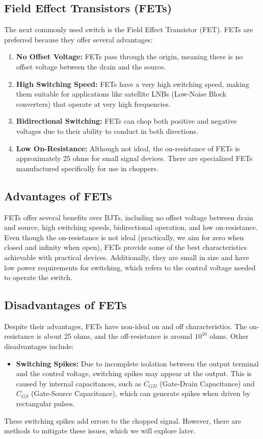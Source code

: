 \documentclass[a4paper,9pt,twoside,openany,twocolumn]{memoir}
\begin{document}
\subsection{Field Effect Transistors (FETs)}
The next commonly used switch is the Field Effect Transistor (FET). FETs are preferred because they offer several advantages:
\begin{enumerate}
    \item \textbf{No Offset Voltage:} FETs pass through the origin, meaning there is no offset voltage between the drain and the source.
    \item \textbf{High Switching Speed:} FETs have a very high switching speed, making them suitable for applications like satellite LNBs (Low-Noise Block converters) that operate at very high frequencies.
    \item \textbf{Bidirectional Switching:} FETs can chop both positive and negative voltages due to their ability to conduct in both directions.
    \item \textbf{Low On-Resistance:} Although not ideal, the on-resistance of FETs is approximately 25 ohms for small signal devices. There are specialized FETs manufactured specifically for use in choppers.
\end{enumerate}

\subsection{Advantages of FETs}
FETs offer several benefits over BJTs, including no offset voltage between drain and source, high switching speeds, bidirectional operation, and low on-resistance. Even though the on-resistance is not ideal (practically, we aim for zero when closed and infinity when open), FETs provide some of the best characteristics achievable with practical devices. Additionally, they are small in size and have low power requirements for switching, which refers to the control voltage needed to operate the switch.

\subsection{Disadvantages of FETs}
Despite their advantages, FETs have non-ideal on and off characteristics. The on-resistance is about 25 ohms, and the off-resistance is around $10^{10}$ ohms. Other disadvantages include:
\begin{itemize}
    \item \textbf{Switching Spikes:} Due to incomplete isolation between the output terminal and the control voltage, switching spikes may appear at the output. This is caused by internal capacitances, such as $C_{GD}$ (Gate-Drain Capacitance) and $C_{GS}$ (Gate-Source Capacitance), which can generate spikes when driven by rectangular pulses.
\end{itemize}
These switching spikes add errors to the chopped signal. However, there are methods to mitigate these issues, which we will explore later.
\end{document}

